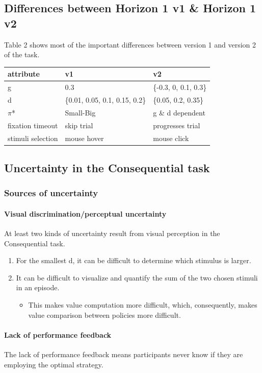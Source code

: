 \documentclass[11pt]{article}
\begin{document}
\subsection{Differences between Horizon 1 v1 \& Horizon 1 v2}
\label{sec:orgc6653ef}
Table 2 shows most of the important differences between version 1 and version 2 of the task.
\begin{table}[htbp]
\label{Table 2}
\centering
\begin{tabular}{lll}
attribute & v1 & v2\\
\hline
g & 0.3 & \{-0.3, 0, 0.1, 0.3\}\\
d & \{0.01, 0.05, 0.1, 0.15, 0.2\} & \{0.05, 0.2, 0.35\}\\
\(\pi\)* & Small-Big & g \& d dependent\\
fixation timeout & skip trial & progresses trial\\
stimuli selection & mouse hover & mouse click\\
\end{tabular}
\end{table}
\subsection{Uncertainty in the Consequential task}
\label{sec:org6d975d8}
\subsubsection{Sources of uncertainty}
\label{sec:org05fdfeb}
\paragraph{Visual discrimination/perceptual uncertainty}
\label{sec:orgfb331f8}
At least two kinds of uncertainty result from visual perception in the Consequential task.
\begin{enumerate}
\item For the smallest d, it can be difficult to determine which stimulus is larger.
\item It can be difficult to visualize and quantify the sum of the two chosen stimuli in an episode.
\begin{itemize}
\item This makes value computation more difficult, which, consequently, makes value comparison between policies more difficult.
\end{itemize}
\end{enumerate}
\paragraph{Lack of performance feedback}
\label{sec:orge686105}
The lack of performance feedback means participants never know if they are employing the optimal strategy.
\end{document}

